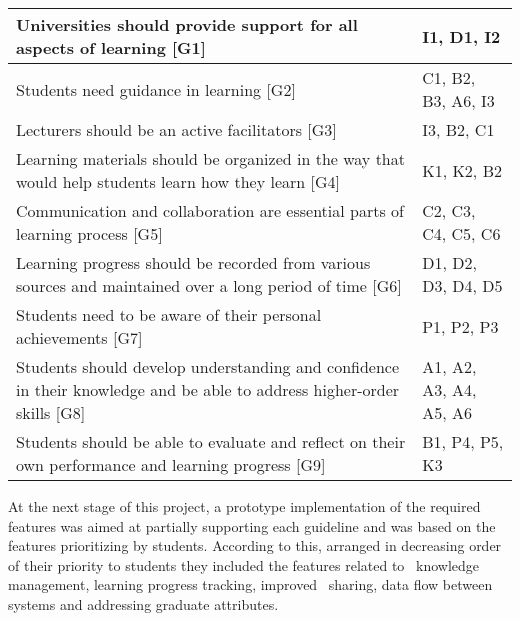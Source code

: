 \begin{center} \small
    \tablelasttail{\hline}
    \begin{supertabular}{|p{9cm}|l|}
     Universities should provide support for all aspects of learning [G1] & I1,
     D1, I2 \\ \hline 
     Students need guidance in learning [G2] & C1, B2, B3, A6, I3 \\ \hline
     Lecturers should be an active facilitators [G3] & I3, B2, C1 \\ \hline
     Learning materials should be organized in the way that would help
students learn how they learn [G4] & K1, K2, B2 \\ \hline
     Communication and collaboration are essential parts of learning
  process [G5] & C2, C3, C4, C5, C6 \\ \hline
     Learning progress should be recorded from various sources and
  maintained over a long period of time [G6] & D1, D2, D3, D4, D5 \\ \hline
     Students need to be aware of their personal achievements [G7] & P1, P2, P3
     \\ \hline 
     Students should develop understanding and confidence in their
  knowledge and be able to address higher-order skills [G8] & A1, A2, A3, A4,
  A5, A6 \\ \hline 
  	Students should be able to evaluate and reflect on their own
  performance and learning progress [G9] & B1, P4, P5, K3 \\ \hline
    \end{supertabular}
    \label{tab:mapping}
\end{center}

At the next stage of this project, a prototype implementation of the required
features was aimed at partially supporting each guideline and was based on the
features prioritizing by students. According to this, arranged in decreasing
order of their priority to students they included the features related to
\ep~knowledge management, learning progress tracking, improved \ep~sharing, data
flow between systems and addressing graduate attributes.

